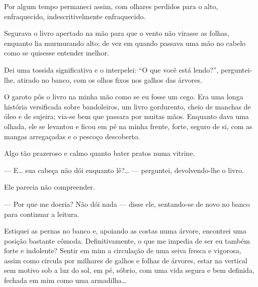Por algum tempo permaneci assim, com olhares perdidos para o alto,
enfraquecido, indescritivelmente enfraquecido.


Segurava o livro apertado na mão para que o vento não virasse as folhas,
enquanto lia murmurando alto; de vez em quando passava uma mão no cabelo como
se quisesse entender melhor.

Dei uma tossida significativa e o interpelei: ``O que você está lendo?'',
perguntei-lhe, atirado no banco, com os olhos fixos nos galhos das árvores.

O garoto pôs o livro na minha mão como se eu fosse um cego. Era uma longa
história versificada sobre bandoleiros, um livro gordurento, cheio de manchas
de óleo e de sujeira; via-se bem que passara por muitas mãos. Enquanto dava
uma olhada, ele se levantou e ficou em pé na minha frente, forte, seguro de
si, com as mangas arregaçadas e o pescoço descoberto.

Algo tão prazeroso e calmo quanto bater pratos numa vitrine.

--- E\ldots{} sua cabeça não dói enquanto lê?\ldots{} --- perguntei,
    devolvendo-lhe o livro.

Ele parecia não compreender.

--- Por que me doeria? Não dói nada --- disse ele, sentando-se de novo no
    banco para continuar a leitura.


Estiquei as pernas no banco e, apoiando as costas numa árvore, encontrei uma
posição bastante cômoda. Definitivamente, o que me impedia de ser eu também
forte e indolente? Sentir em mim a circulação de uma seiva fresca e vigorosa,
assim como circula por milhares de galhos e folhas de árvores, estar na
vertical sem motivo sob a luz do sol, em pé, sóbrio, com uma vida segura e
bem definida, fechada em mim como uma armadilha\ldots{}

